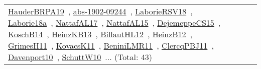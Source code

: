 {\begin{longtable}{lp{3cm}>{\raggedright\arraybackslash}p{6cm}>{\raggedright\arraybackslash}p{6cm}>{\raggedright\arraybackslash}p{8cm}}
\href{articles/HauderBRPA19.pdf}{HauderBRPA19}~\cite{HauderBRPA19}, \href{articles/abs-1902-09244.pdf}{abs-1902-09244}~\cite{abs-1902-09244}, \href{articles/LaborieRSV18.pdf}{LaborieRSV18}~\cite{LaborieRSV18}, \href{papers/Laborie18a.pdf}{Laborie18a}~\cite{Laborie18a}, \href{articles/NattafAL17.pdf}{NattafAL17}~\cite{NattafAL17}, \href{articles/NattafAL15.pdf}{NattafAL15}~\cite{NattafAL15}, \href{papers/DejemeppeCS15.pdf}{DejemeppeCS15}~\cite{DejemeppeCS15}, \href{papers/KoschB14.pdf}{KoschB14}~\cite{KoschB14}, \href{papers/HeinzKB13.pdf}{HeinzKB13}~\cite{HeinzKB13}, \href{papers/BillautHL12.pdf}{BillautHL12}~\cite{BillautHL12}, \href{papers/HeinzB12.pdf}{HeinzB12}~\cite{HeinzB12}, \href{papers/GrimesH11.pdf}{GrimesH11}~\cite{GrimesH11}, \href{articles/KovacsK11.pdf}{KovacsK11}~\cite{KovacsK11}, \href{articles/BeniniLMR11.pdf}{BeniniLMR11}~\cite{BeniniLMR11}, \href{papers/ClercqPBJ11.pdf}{ClercqPBJ11}~\cite{ClercqPBJ11}, \href{papers/Davenport10.pdf}{Davenport10}~\cite{Davenport10}, \href{papers/SchuttW10.pdf}{SchuttW10}~\cite{SchuttW10}... (Total: 43)\\

\end{longtable}}
